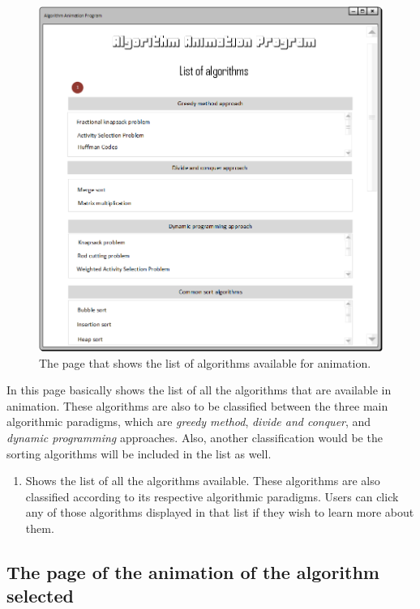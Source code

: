 \begin{figure}[H]
\centering
\hspace*{-0.5cm}
\includegraphics[scale=0.8]{images/report_images/uiListOfAlgorithms.png}
\caption{The page that shows the list of algorithms available for animation.}
\label{uiListOfAlgorithms}
\end{figure}

In this page basically shows the list of all the algorithms that are available in animation. These algorithms are also to be classified between the three main algorithmic paradigms, which are \textit{greedy method}, \textit{divide and conquer}, and \textit{dynamic programming} approaches. Also, another classification would be the sorting algorithms will be included in the list as well.

\begin{enumerate}
\item Shows the list of all the algorithms available. These algorithms are also classified according to its respective algorithmic paradigms. Users can click any of those algorithms displayed in that list if they wish to learn more about them.
\end{enumerate}

\subsection{The page of the animation of the algorithm selected}

